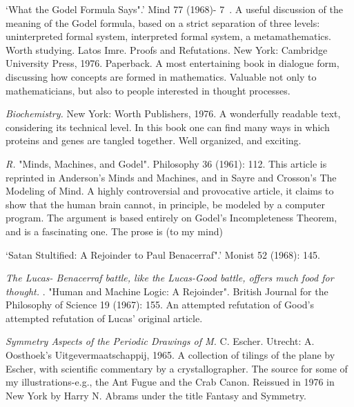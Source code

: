  `What the Godel Formula Says".' Mind 77 (1968)- 7~. A useful discussion of the meaning of the Godel formula, based on a strict separation of three levels: uninterpreted formal system, interpreted formal system, a metamathematics. Worth studying. Latos Imre. Proofs and Refutations. New York: Cambridge University Press, 1976. Paperback. A most entertaining book in dialogue form, discussing how concepts are formed in mathematics. Valuable not only to mathematicians, but also to people interested in thought processes.

 {\sl Biochemistry.} \llap{**\enspace}New York: Worth Publishers, 1976. A wonderfully readable text, considering its technical level. In this book one can find many ways in which proteins and genes are tangled together. Well organized, and exciting.

 {\sl R.} \llap{**\enspace}"Minds, Machines, and Godel". Philosophy 36 (1961): 112. This article is reprinted in Anderson's Minds and Machines, and in Sayre and Crosson's The Modeling of Mind. A highly controversial and provocative article, it claims to show that the human brain cannot, in principle, be modeled by a computer program. The argument is based entirely on Godel's Incompleteness Theorem, and is a fascinating one. The prose is (to my mind)

 `Satan Stultified: A Rejoinder to Paul Benacerraf".' Monist 52 (1968): 145.

 {\sl The Lucas- Benacerraf battle, like the Lucas-Good battle, offers much food for thought.} . "Human and Machine Logic: A Rejoinder". British Journal for the Philosophy of Science 19 (1967): 155. An attempted refutation of Good's attempted refutation of Lucas' original article.

 {\sl Symmetry Aspects of the Periodic Drawings of M.} \llap{**\enspace}C. Escher. Utrecht: A. Oosthoek's Uitgevermaatschappij, 1965. A collection of tilings of the plane by Escher, with scientific commentary by a crystallographer. The source for some of my illustrations-e.g., the Ant Fugue and the Crab Canon. Reissued in 1976 in New York by Harry N. Abrams under the title Fantasy and Symmetry.


